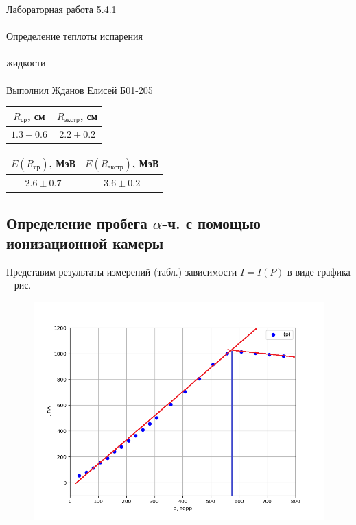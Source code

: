 \documentclass{astroedu-lab}
\begin{document}
\begin{problem}{\huge Лабораторная работа 5.4.1\\\\Определение теплоты испарения\\\\жидкости\\\\Выполнил Жданов Елисей Б01-205}
		\begin{table}[h!]
		\centering
		\begin{tabular}{|c|c|}
						\hline
						$R_\text{ср}$, см & $R_\text{экстр}$, см \\ \hline
						$1.3 \pm 0.6 $   & $2.2 \pm 0.2$       \\ \hline
				\end{tabular}
				{\begin{tabular}{|c|c|}
						\hline
						$E(R_\text{ср})$, МэВ & $E(R_\text{экстр})$, МэВ \\ \hline
						$2.6 \pm 0.7 $     & $3.6 \pm 0.2 $        \\ \hline
				\end{tabular}}   
		\end{table}
	
		\subsection{Определение пробега $\alpha$-ч. с помощью ионизационной камеры}
			Представим результаты измерений (табл.) зависимости $I=I(P)$ в виде графика -- рис. 
		
		\begin{figure}[h!]
		\centering
		\includegraphics[scale=0.5]{Figure_3.png}  
		\end{figure}
		

\end{problem}
\end{document}

